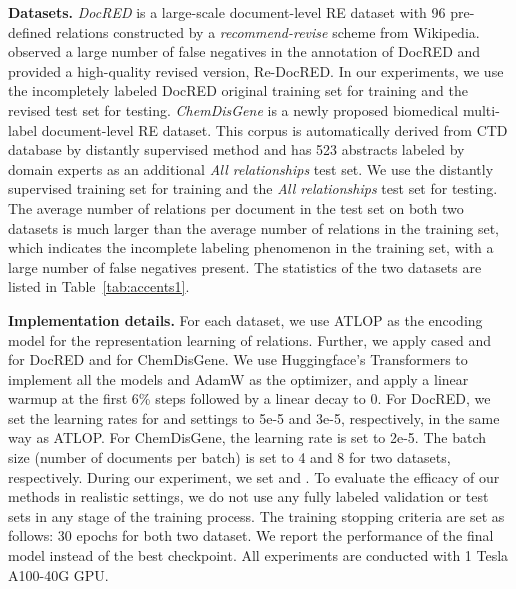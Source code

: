 \documentclass[11pt]{article}
\begin{document}
\textbf{Datasets.} \enspace \emph{DocRED} \citep{yao-etal-2019-docred} is a large-scale document-level RE dataset with 96 pre-defined relations constructed by a \emph{recommend-revise} scheme from Wikipedia. \citep{tan2022revisiting} observed a large number of false negatives in the annotation of DocRED and provided a high-quality revised version, Re-DocRED. In our experiments, we use the incompletely labeled DocRED original training set for training and the revised test set for testing. \enspace \emph{ChemDisGene} \citep{zhang-etal-2022-distant} is a newly proposed biomedical multi-label document-level RE dataset. This corpus is automatically derived from CTD database \citep{davis2021comparative} by distantly supervised method and has 523 abstracts labeled by domain experts as an additional \emph{All relationships} test set. We use the distantly supervised training set for training and the \emph{All relationships} test set for testing. \enspace The average number of relations per document in the test set on both two datasets is much larger than the average number of relations in the training set, which indicates the incomplete labeling phenomenon in the training set, with a large number of false negatives present. The statistics of the two datasets are listed in Table~\ref{tab:accents1}.

\textbf{Implementation details.} \enspace For each dataset, we use ATLOP \citep{Zhou_Huang_Ma_Huang_2021} as the encoding model for the representation learning of relations. Further, we apply cased  \citep{devlin-etal-2019-bert} and  \citep{liu2019roberta} for DocRED and  \citep{10.1145/3458754} for ChemDisGene. We use Huggingface's Transformers \citep{wolf-etal-2020-transformers} to implement all the models and AdamW \citep{loshchilov2018decoupled} as the optimizer, and apply a linear warmup \citep{goyal2017accurate} at the first 6\% steps followed by a linear decay to 0. For DocRED, we set the learning rates for  and  settings to 5e-5 and 3e-5, respectively, in the same way as ATLOP. For ChemDisGene, the learning rate is set to 2e-5. The batch size (number of documents per batch) is set to 4 and 8 for two datasets, respectively. During our experiment, we set  and . To evaluate the efficacy of our methods in realistic settings, we do not use any fully labeled validation or test sets in any stage of the training process. The training stopping criteria are set as follows: 30 epochs for both two dataset. We report the performance of the final model instead of the best checkpoint. All experiments are conducted with 1 Tesla A100-40G GPU.
\end{document}
